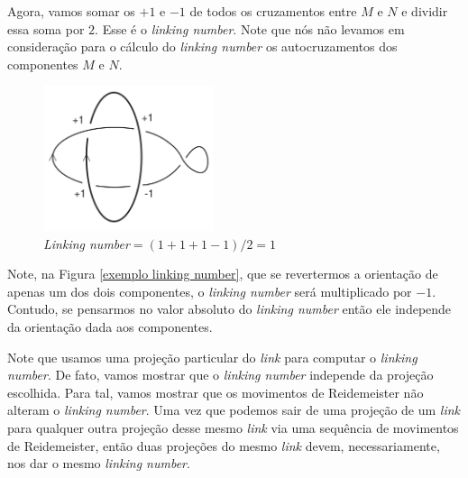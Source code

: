 	\par\vspace{0.3cm} Agora, vamos somar os $+1$ e $-1$ de todos os cruzamentos entre $M$ e $N$ e dividir 
	essa soma por $2$. Esse é o \textit{linking number}. Note que nós não levamos em consideração para o 
	cálculo do \textit{linking number} os autocruzamentos dos componentes $M$ e $N$. 
	\begin{figure}[H]
		\begin{center}
			\includegraphics[width=5cm]{Images/exemplo_linking_number.png}
		\end{center}\caption{\textit{Linking number}$ = (1+1+1-1)/2 = 1$}\label{exemplo linking number}
	\end{figure}
	\par\vspace{0.3cm} Note, na Figura \eqref{exemplo linking number}, que se revertermos a orientação de 
	apenas um dos dois componentes, o \textit{linking number} será multiplicado por $-1$. Contudo, se 
	pensarmos no valor absoluto do \textit{linking number} então ele independe da orientação dada aos componentes.
	
	\par\vspace{0.3cm} Note que usamos uma projeção particular do \textit{link} para computar o 
	\textit{linking number}. De fato, vamos mostrar que o \textit{linking number} independe da projeção 
	escolhida. Para tal, vamos mostrar que os movimentos de Reidemeister não alteram o \textit{linking number}. 
	Uma vez que podemos sair de uma projeção de um \textit{link} para qualquer outra projeção desse mesmo
	\textit{link} via uma sequência de movimentos de Reidemeister, então duas projeções do mesmo 
	\textit{link} devem, necessariamente, nos dar o mesmo \textit{linking number}.
	
